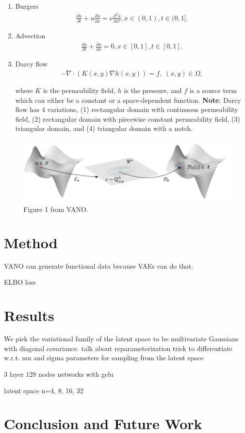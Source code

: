 \documentclass[11pt, fullpage,letterpaper]{article}
\begin{document}
\begin{enumerate}
    \item Burgers
        \begin{align}
            \frac{\partial u}{\partial t} + u \frac{\partial u}{\partial x} = \nu \frac{\partial^2 u}{\partial x^2}, x \in (0, 1), t \in (0, 1].
        \end{align}

    \item Advection
        \begin{align}
            \frac{\partial u}{\partial t} + \frac{\partial u}{\partial x} = 0, x \in [0, 1], t \in [0, 1].
        \end{align}

    \item Darcy flow
        \begin{align}
            - \nabla \cdot (K(x, y) \nabla h(x, y)) = f, \; (x, y) \in \Omega,
        \end{align}

        where $K$ is the permeability field, $h$ is the pressure, and $f$ is a source term which can either be a constant or a space-dependent function. \textbf{Note}: Darcy flow has 4 variations, (1) rectangular domain with continuous permeability field, (2) rectangular domain with piecewise constant permeability field, (3) triangular domain, and (4) triangular domain with a notch.
\end{enumerate}

\begin{figure}
    \centering
    \includegraphics[width=0.5\linewidth]{fig.png}
    \caption{Figure 1 from VANO.}
    \label{fig:vano}
\end{figure}


\section{Method}
VANO can generate functional data because VAEs can do that.

ELBO loss

\section{Results}

We pick the variational family of the latent space to be multivariate Gaussians with diagonal covariance.
talk about reparameterization trick to differentiate w.r.t. mu and sigma parameters for sampling from the latent space

3 layer 128 nodes networks with gelu

latent space
n=4, 8, 16, 32

\section{Conclusion and Future Work}


\end{document}
